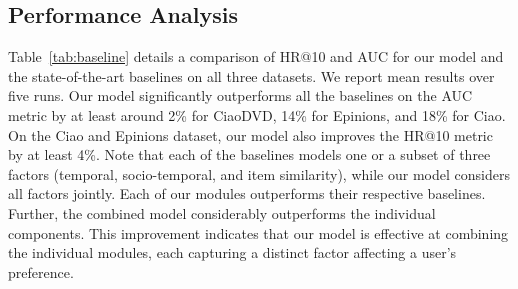 \subsection{Performance Analysis}

Table~\ref{tab:baseline} details a comparison of HR@10 and AUC for our model and the state-of-the-art baselines on all three datasets. We report mean results over five runs.
Our model significantly outperforms all the baselines on the AUC metric by at least around 2\% for CiaoDVD, 14\% for Epinions, and 18\% for Ciao.
On the Ciao and Epinions dataset, our \ours {} model also improves the HR@10 metric by at least 4\%. Note that each of the baselines models one or a subset of three factors (temporal, socio-temporal, and item similarity), while our \ours {} model considers all factors jointly. Each of our modules outperforms their respective baselines. Further, the combined \ours {} model considerably outperforms the individual components. This improvement indicates that our model is effective at combining the individual modules, each capturing a distinct factor affecting a user's preference.

